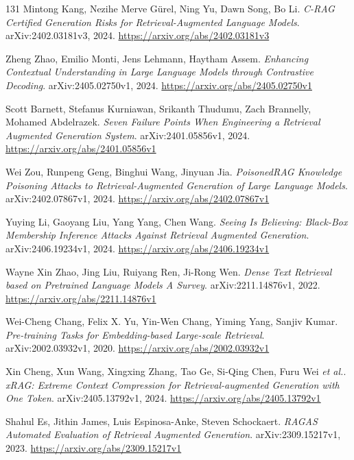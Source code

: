 \documentclass[11pt,a4paper]{article}
\begin{document}
\begin{thebibliography}{131}
Mintong Kang, Nezihe Merve G\"{u}rel, Ning Yu, Dawn Song, Bo Li.
\newblock \emph{C-RAG Certified Generation Risks for Retrieval-Augmented Language Models}.
\newblock arXiv:2402.03181v3, 2024.
\newblock \url{https://arxiv.org/abs/2402.03181v3}

Zheng Zhao, Emilio Monti, Jens Lehmann, Haytham Assem.
\newblock \emph{Enhancing Contextual Understanding in Large Language Models through Contrastive Decoding}.
\newblock arXiv:2405.02750v1, 2024.
\newblock \url{https://arxiv.org/abs/2405.02750v1}

Scott Barnett, Stefanus Kurniawan, Srikanth Thudumu, Zach Brannelly, Mohamed Abdelrazek.
\newblock \emph{Seven Failure Points When Engineering a Retrieval Augmented Generation System}.
\newblock arXiv:2401.05856v1, 2024.
\newblock \url{https://arxiv.org/abs/2401.05856v1}

Wei Zou, Runpeng Geng, Binghui Wang, Jinyuan Jia.
\newblock \emph{PoisonedRAG Knowledge Poisoning Attacks to Retrieval-Augmented Generation of Large Language Models}.
\newblock arXiv:2402.07867v1, 2024.
\newblock \url{https://arxiv.org/abs/2402.07867v1}

Yuying Li, Gaoyang Liu, Yang Yang, Chen Wang.
\newblock \emph{Seeing Is Believing: Black-Box Membership Inference Attacks Against Retrieval Augmented Generation}.
\newblock arXiv:2406.19234v1, 2024.
\newblock \url{https://arxiv.org/abs/2406.19234v1}

Wayne Xin Zhao, Jing Liu, Ruiyang Ren, Ji-Rong Wen.
\newblock \emph{Dense Text Retrieval based on Pretrained Language Models A Survey}.
\newblock arXiv:2211.14876v1, 2022.
\newblock \url{https://arxiv.org/abs/2211.14876v1}

Wei-Cheng Chang, Felix X. Yu, Yin-Wen Chang, Yiming Yang, Sanjiv Kumar.
\newblock \emph{Pre-training Tasks for Embedding-based Large-scale Retrieval}.
\newblock arXiv:2002.03932v1, 2020.
\newblock \url{https://arxiv.org/abs/2002.03932v1}

Xin Cheng, Xun Wang, Xingxing Zhang, Tao Ge, Si-Qing Chen, Furu Wei \emph{et al.}.
\newblock \emph{xRAG: Extreme Context Compression for Retrieval-augmented Generation with One Token}.
\newblock arXiv:2405.13792v1, 2024.
\newblock \url{https://arxiv.org/abs/2405.13792v1}

Shahul Es, Jithin James, Luis Espinosa-Anke, Steven Schockaert.
\newblock \emph{RAGAS Automated Evaluation of Retrieval Augmented Generation}.
\newblock arXiv:2309.15217v1, 2023.
\newblock \url{https://arxiv.org/abs/2309.15217v1}


\end{thebibliography}
\end{document}
